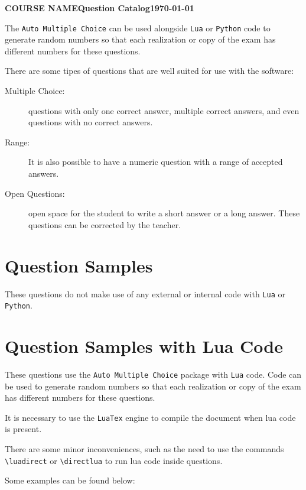 \documentclass[a4paper]{article}
\newcommand{\ExamTitle}{\textbf{COURSE NAME\hfill Question Catalog}}
\newcommand{\ExamDate}{\today}
\begin{document}
\noindent\ExamTitle\hfill\textbf{\ExamDate}

The \texttt{Auto Multiple Choice} can be used alongside \texttt{Lua} or \texttt{Python} code to generate random numbers so that each realization or copy of the exam has different numbers for these questions.

There are some tipes of questions that are well suited for use with the software:

\begin{description}
	\item[Multiple Choice:] questions with only one correct answer, multiple correct answers, and even questions with no correct answers.
	\item[Range:] It is also possible to have a numeric question with a range of accepted answers.
	\item[Open Questions:] open space for the student to write a short answer or a long answer. These questions can be corrected by the teacher.
\end{description}

\section{Question Samples}

These questions do not make use of any external or internal code with \texttt{Lua} or \texttt{Python}.


\section{Question Samples with Lua Code}

These questions use the \texttt{Auto Multiple Choice} package with \texttt{Lua} code.
Code can be used to generate random numbers so that each realization or copy of the exam has different numbers for these questions.

It is necessary to use the \texttt{LuaTex} engine to compile the document when lua code is present.

There are some minor inconveniences, such as the need to use the commands \texttt{\textbackslash{}luadirect{}} or \texttt{\textbackslash{}directlua{}} to run lua code inside questions.

Some examples can be found below:
\end{document}
